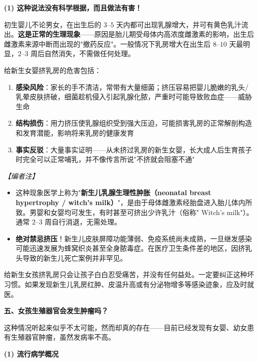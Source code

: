 \begin{enumerate}
\vspace{0.5em}
\noindent\textbf{(1) 这种说法没有科学根据，而且做法有害！}

初生婴儿不论男女，在出生后的 $3$--$5$ 天内都可出现乳腺增大，并可有黄色乳汁流出。\textbf{这是正常的生理现象}——原因是胎儿期受母体内高浓度雌激素的影响，出生后雌激素来源中断而出现的"撤药反应"。一般情况下乳房增大在出生后 $8$--$10$ 天最明显，$2$--$3$ 周后自然消失，不需做任何处理。

给新生女婴挤乳房的危害包括：
\begin{enumerate}
	\item \textbf{感染风险}：家长的手不清洁，常带有大量细菌；挤压容易把婴儿脆嫩的乳头/乳晕皮肤挤破，细菌趁机侵入引起乳腺化脓，严重时可能导致败血症——威胁生命
	\item \textbf{结构损伤}：用力挤压使乳腺组织受到强大压迫，可能损害乳房的正常解剖构造和发育潜能，影响将来乳房的健康发育
	\item \textbf{事实反驳}：大量事实证明——从未挤过乳房的新生女婴，长大成人后生育孩子时完全可以正常哺乳，并不像传言所说"不挤就会阻塞不通"
\end{enumerate}

\vspace{0.3em}
\noindent\textit{【编者注】}
\begin{itemize}
	\item 这种现象医学上称为"\textbf{新生儿乳腺生理性肿胀（neonatal breast hypertrophy / witch's milk）}"，是由于母体雌激素经胎盘进入胎儿体内所致。男婴和女婴均可发生，有时甚至可挤出少许乳汁（俗称" Witch's milk"）。通常 $2$--$3$ 周自行消退，无需处理。
	\item \textbf{绝对禁忌挤压}！新生儿皮肤屏障功能薄弱、免疫系统尚未成熟，一旦继发感染可能迅速发展为蜂窝织炎甚至全身脓毒症。在医疗卫生条件差的地区，因挤乳头导致的新生儿死亡案例并非罕见。
\end{itemize}

\begin{tcolorbox}[colback=pink!5!white,colframe=red!50!black,title=贴心小叮咛]
给新生女孩挤乳房只会让孩子白白忍受痛苦，并没有任何益处。一定要纠正这种坏习惯。如果发现新生儿乳房红肿、皮温升高或有分泌物增多等感染迹象，应及时就医。
\end{tcolorbox}

\vspace{0.8em}
\noindent\textbf{五、女孩生殖器官会发生肿瘤吗？}

这种情况听起来似乎不太可能，然而却真的存在——目前已经发现有女婴、幼女患有生殖器官肿瘤，虽然发病率不高。

\vspace{0.5em}
\noindent\textbf{(1) 流行病学概况}


\end{enumerate}
